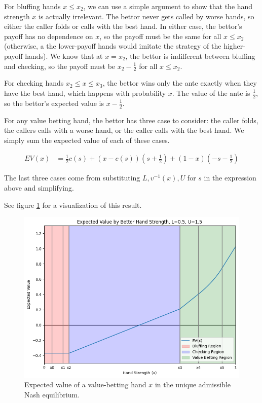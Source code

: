 \documentclass[../../main/main.tex]{subfiles}
\begin{document}
\begin{customproof}
    For bluffing hands $x \leq x_2$, we can use a simple argument to show that the hand strength $x$ is actually irrelevant. The bettor never gets called by worse hands, so either the caller folds or calls with the best hand. In either case, the bettor's payoff has no dependence on $x$, so the payoff must be the same for all $x \leq x_2$ (otherwise, a the lower-payoff hands would imitate the strategy of the higher-payoff hands). We know that at $x=x_2$, the bettor is indifferent between bluffing and checking, so the payoff must be $x_2-\frac{1}{2}$ for all $x \leq x_2$.

    For checking hands $x_2 \leq x \leq x_3$, the bettor wins only the ante exactly when they have the best hand, which happens with probability $x$. The value of the ante is $\frac{1}{2}$, so the bettor's expected value is $x-\frac{1}{2}$.

    For any value betting hand, the bettor has three case to consider: the caller folds, the callers calls with a worse hand, or the caller calls with the best hand. We simply sum the expected value of each of these cases.

    \begin{align*}
        EV(x) & = \frac{1}{2} c(s) + (x - c(s)) \left(s+\frac{1}{2}\right) + (1-x) \left(-s-\frac{1}{2}\right)
    \end{align*}
    
    The last three cases come from substituting $L, v^{-1}(x), U$ for $s$ in the expression above and simplifying.
\end{customproof}

See figure \ref{fig:ev_x} for a visualization of this result.

\begin{figure}[h!]
    \centering
    \includegraphics[width=\textwidth]{images/ExpectedPayoffs.png}
    \caption{Expected value of a value-betting hand $x$ in the unique admissible Nash equilibrium.}
    \label{fig:ev_x}
\end{figure}
\end{document}
